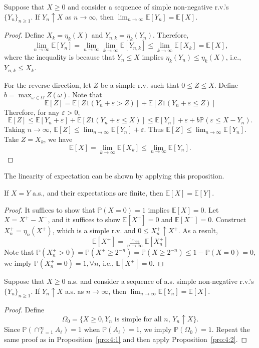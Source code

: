 \begin{proposition}\label{pro:4:1}
Suppose that $X\ge0$ and consider a sequence of simple non-negative r.v.'s $\{Y_n\}_{n\ge1}$.
If $Y_n\uparrow X$ as $n\to\infty$, then $\lim_{n\to\infty}\mathbb{E}[Y_n] = \mathbb{E}[X]$.
\end{proposition}
\begin{proof}
Define $X_k = \eta_k(X)$ and $Y_{n,k} = \eta_k(Y_n)$. Therefore,
\[
\lim_{n\to\infty}\mathbb{E}[Y_n]=\lim_{n\to\infty}\lim_{k\to\infty}\mathbb{E}[Y_{n,k}]
\le\lim_{k\to\infty}\mathbb{E}[X_k]=\mathbb{E}[X],
\]
where the inequality is because that $Y_n\le X$ implies $\eta_k(Y_n)\le \eta_k(X)$, i.e., $Y_{n,k}\le X_k$.

For the reverse direction, let $Z$ be a simple r.v. such that $0\le Z\le X$. Define $b = \max_{\omega\in\Omega}Z(\omega)$. Note that
\[
\mathbb{E}[Z] = \mathbb{E}[Z1(Y_n+\varepsilon>Z)] + \mathbb{E}[Z1(Y_n+\varepsilon\le Z)]
\]
Therefore, for any $\varepsilon>0$,
\[
\mathbb{E}[Z] \le \mathbb{E}[Y_n+\varepsilon] + \mathbb{E}[Z1(Y_n+\varepsilon\le X)]\le
\mathbb{E}[Y_n] + \varepsilon + b\mathbb{P}(\varepsilon\le X-Y_n).
\]
Taking $n\to\infty$, $\mathbb{E}[Z] \le \lim_{n\to\infty}\mathbb{E}[Y_n] +\varepsilon$. Thus $\mathbb{E}[Z] \le \lim_{n\to\infty}\mathbb{E}[Y_n]$. Take $Z= X_k$, we have
\[
\mathbb{E}[X] = \lim_{k\to\infty}\mathbb{E}[X_k]\le  \lim_{n\to\infty}\mathbb{E}[Y_n].
\]

\end{proof}
The linearity of expectation can be shown by applying this proposition.

\begin{proposition}\label{pro:4:2}
If $X=Y$ a.s., and their expectations are finite, then $\mathbb{E}[X]=\mathbb{E}[Y]$.
\end{proposition}
\begin{proof}
It suffices to show that $\mathbb{P}(X=0)=1$ implies $\mathbb{E}[X]=0$.
Let $X=X^+-X^-$, and it suffices to show $\mathbb{E}[X^+]=0$ and $\mathbb{E}[X^-]=0$.
Construct $X_n^+ = \eta_n(X^+)$, which is a simple r.v. and $0\le X_n^+\uparrow X^+$.
As a result,
\[
\mathbb{E}[X^+] = \lim_{n\to\infty}\mathbb{E}[X_n^+] 
\]
Note that $\mathbb{P}(X_n^+>0) = \mathbb{P}(X^+\ge 2^{-n}) = \mathbb{P}(X\ge 2^{-n}) \le 1-\mathbb{P}(X=0)=0$, we imply $\mathbb{P}(X_n^+=0)=1,\forall n$, i.e., $\mathbb{E}[X^+]=0$.
\end{proof}


\begin{proposition}
Suppose that $X\ge0$ a.s. and consider a sequence of a.s. simple non-negative r.v.'s $\{Y_n\}_{n\ge1}$.
If $Y_n\uparrow X$ a.s. as $n\to\infty$, then $\lim_{n\to\infty}\mathbb{E}[Y_n] = \mathbb{E}[X]$.
\end{proposition}
\begin{proof}
Define
\[
\Omega_0 = \{X\ge0, \text{$Y_n$ is simple for all $n$, $Y_n\uparrow X$}\}.
\]
Since $\mathbb{P}(\cap_{\ell=1}^\infty A_\ell)=1$ when $\mathbb{P}(A_\ell)=1$, we imply $\mathbb{P}(\Omega_0)=1$.
Repeat the same proof as in Proposition~\ref{pro:4:1} and then apply Proposition~\ref{pro:4:2}.

\end{proof}

